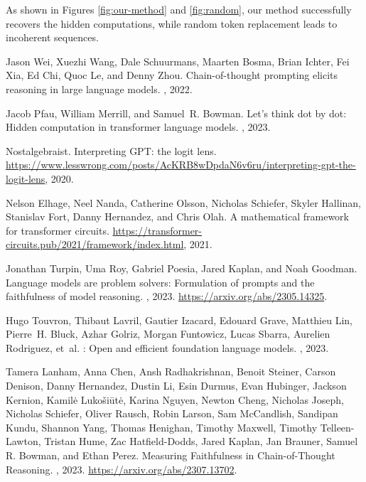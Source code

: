 \documentclass{article}
\begin{document}
As shown in Figures \ref{fig:our-method} and \ref{fig:random}, our method successfully recovers the hidden computations, while random token replacement leads to incoherent sequences.

\newpage
\begin{thebibliography}{12}

Jason Wei, Xuezhi Wang, Dale Schuurmans, Maarten Bosma, Brian Ichter, Fei Xia,
  Ed Chi, Quoc Le, and Denny Zhou.
\newblock Chain-of-thought prompting elicits reasoning in large language
  models.
, 2022.

Jacob Pfau, William Merrill, and Samuel~R. Bowman.
\newblock Let's think dot by dot: Hidden computation in transformer language
  models.
, 2023.

Nostalgebraist.
\newblock Interpreting {GPT}: the logit lens.
\newblock
  \url{https://www.lesswrong.com/posts/AcKRB8wDpdaN6v6ru/interpreting-gpt-the-logit-lens},
  2020.

Nelson Elhage, Neel Nanda, Catherine Olsson, Nicholas Schiefer, Skyler Hallinan,
  Stanislav Fort, Danny Hernandez, and Chris Olah.
\newblock A mathematical framework for transformer circuits.
\newblock
  \url{https://transformer-circuits.pub/2021/framework/index.html}, 2021.

Jonathan Turpin, Uma Roy, Gabriel Poesia, Jared Kaplan, and Noah Goodman.
\newblock Language models are problem solvers: Formulation of prompts and the
  faithfulness of model reasoning.
, 2023.
\newblock \url{https://arxiv.org/abs/2305.14325}.

Hugo Touvron, Thibaut Lavril, Gautier Izacard, Edouard Grave, Matthieu
  Lin, Pierre~H. Bluck, Azhar Golriz, Morgan Funtowicz, Lucas
  Sbarra, Aurelien Rodriguez, et~al.
: Open and efficient foundation language models.
, 2023.

Tamera Lanham, Anna Chen, Ansh Radhakrishnan, Benoit Steiner, Carson Denison, Danny Hernandez, Dustin Li, Esin Durmus, Evan Hubinger, Jackson Kernion, Kamilė Lukošiūtė, Karina Nguyen, Newton Cheng, Nicholas Joseph, Nicholas Schiefer, Oliver Rausch, Robin Larson, Sam McCandlish, Sandipan Kundu, Shannon Yang, Thomas Henighan, Timothy Maxwell, Timothy Telleen-Lawton, Tristan Hume, Zac Hatfield-Dodds, Jared Kaplan, Jan Brauner, Samuel R. Bowman, and Ethan Perez.
\newblock Measuring Faithfulness in Chain-of-Thought Reasoning.
, 2023.
\newblock \url{https://arxiv.org/abs/2307.13702}.


\end{thebibliography}
\end{document}
